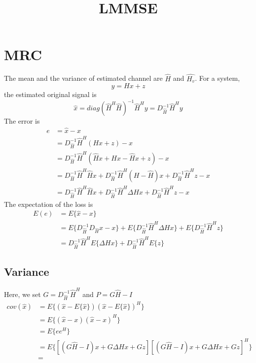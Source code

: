 \documentclass{article}
\title{LMMSE}
\author{}
\date{}
\begin{document}
\maketitle
\section{MRC}
The mean and the variance of estimated channel are $\hat{H}$ and $\hat{H_v}$.
For a system,
\[
y = Hx + z
\]
the estimated original signal is 
\[
\hat{x} = diag(\hat{H}^H\hat{H})^{-1}\hat{H}^Hy = D_{\hat{H}}^{-1} \hat{H}^Hy
\]
The error is
\[
\begin{split}
e &= \hat{x} - x \\
&= D_{\hat{H}}^{-1} \hat{H}^H (Hx + z)  - x\\
&= D_{\hat{H}}^{-1} \hat{H}^H (\hat{H}x + Hx - \hat{H}x + z) - x \\
&= D_{\hat{H}}^{-1} \hat{H}^H \hat{H}x + D_{\hat{H}}^{-1} \hat{H}^H(H - \hat{H})x + D_{\hat{H}}^{-1} \hat{H}^H z - x \\
&= D_{\hat{H}}^{-1} \hat{H}^H \hat{H}x + D_{\hat{H}}^{-1} \hat{H}^H \Delta Hx + D_{\hat{H}}^{-1} \hat{H}^H z - x
\end{split}
\]
The expectation of the loss is
\[
\begin{split}
E(e) &= E\{\hat{x} - x\} \\
&= E\{D_{\hat{H}}^{-1} D_{\hat{H}}x - x \} + E\{ D_{\hat{H}}^{-1} \hat{H}^H \Delta Hx\} + E\{D_{\hat{H}}^{-1} \hat{H}^H z\} \\
&= D_{\hat{H}}^{-1} \hat{H}^H E\{ \Delta Hx\} + D_{\hat{H}}^{-1} \hat{H}^HE\{z\}
\end{split}
\]
\subsection{Variance}
Here, we set $G= D_{\hat{H}}^{-1} \hat{H}^H$ and $P=G\hat{H}-I$
\[
\begin{split}
cov(\hat{x}) &= E\{(\hat{x} - E\{\hat{x}\})(\hat{x} - E\{\hat{x}\})^H\} \\
&= E\{(\hat{x} - x)(\hat{x} - x)^H\} \\
&= E\{ee^H\} \\
&= E\{[(G\hat{H}-I)x + G\Delta Hx + Gz][(G\hat{H}-I)x + G\Delta Hx + Gz]^H \} \\
&= 
\end{split}
\]
\end{document}
